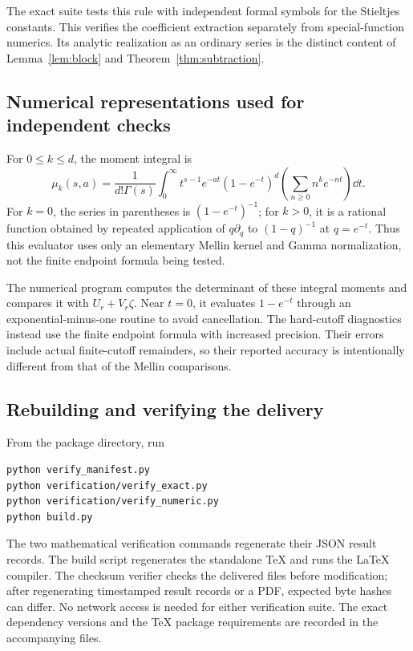 The exact suite tests this rule with independent formal symbols for the
Stieltjes constants. This verifies the coefficient extraction separately
from special-function numerics. Its analytic realization as an ordinary
series is the distinct content of Lemma~\ref{lem:block} and
Theorem~\ref{thm:subtraction}.

\subsection{Numerical representations used for independent checks}
For $0\le k\le d$, the moment integral is
\begin{equation}\label{eq:mellin-check}
 \mu_k(s,a)=\frac1{d!\Gamma(s)}\int_0^\infty
       t^{s-1}e^{-at}(1-e^{-t})^d
       \left(\sum_{n\ge0}n^k e^{-nt}\right)\dd t.
\end{equation}
For $k=0$, the series in parentheses is $(1-e^{-t})^{-1}$;
for $k>0$, it is a rational function obtained by repeated application
of $q\partial_q$ to $(1-q)^{-1}$ at $q=e^{-t}$. Thus this evaluator
uses only an elementary Mellin kernel and Gamma normalization, not the
finite endpoint formula being tested.

The numerical program computes the determinant of these integral moments
and compares it with $U_r+V_r\zeta$. Near $t=0$, it evaluates
$1-e^{-t}$ through an exponential-minus-one routine to avoid cancellation.
The hard-cutoff diagnostics instead use the finite endpoint formula with
increased precision. Their errors include actual finite-cutoff remainders,
so their reported accuracy is intentionally different from that of the
Mellin comparisons.

\subsection{Rebuilding and verifying the delivery}
From the package directory, run
\begin{verbatim}
python verify_manifest.py
python verification/verify_exact.py
python verification/verify_numeric.py
python build.py
\end{verbatim}
The two mathematical verification commands regenerate their JSON result records. The build
script regenerates the standalone TeX and runs the LaTeX compiler. The
checksum verifier checks the delivered files before modification; after
regenerating timestamped result records or a PDF, expected byte hashes
can differ. No network access is needed for either verification suite.
The exact dependency versions and the TeX package requirements are
recorded in the accompanying files.
